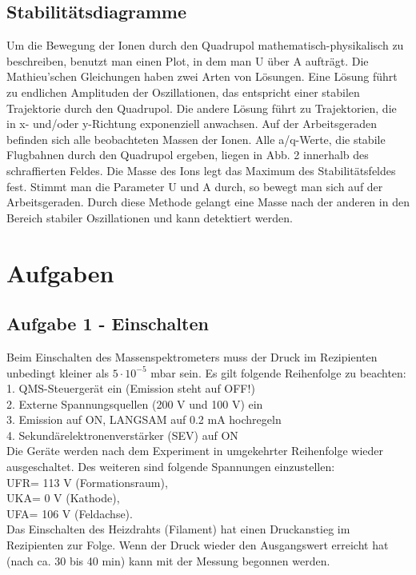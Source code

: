 \subsection{Stabilitätsdiagramme}
Um die Bewegung der Ionen durch den Quadrupol mathematisch-physikalisch zu beschreiben, benutzt man einen Plot, in dem man U über A aufträgt. Die Mathieu'schen Gleichungen haben zwei Arten von Lösungen. Eine Lösung führt zu endlichen Amplituden der Oszillationen, das entspricht einer stabilen Trajektorie durch den Quadrupol. Die andere Lösung führt zu Trajektorien, die in x- und/oder y-Richtung exponenziell anwachsen. Auf der Arbeitsgeraden befinden sich alle beobachteten Massen der Ionen. Alle a/q-Werte, die stabile Flugbahnen durch den Quadrupol ergeben, liegen in Abb. 2 innerhalb des schraffierten Feldes. Die Masse des Ions legt das Maximum des Stabilitätsfeldes fest. Stimmt man die Parameter U und A durch, so bewegt man sich auf der Arbeitsgeraden. Durch diese Methode gelangt eine Masse nach der anderen in den Bereich stabiler Oszillationen und kann detektiert werden.


\newpage
\section{Aufgaben}
\subsection*{Aufgabe 1 - Einschalten}
Beim Einschalten des Massenspektrometers muss der Druck im Rezipienten unbedingt kleiner als $5 \cdot 10^{-5}$ mbar sein. Es gilt folgende Reihenfolge zu beachten:\\ 
1. QMS-Steuergerät ein (Emission steht auf OFF!)\\ 
2. Externe Spannungsquellen (200 V und 100 V) ein\\ 
3. Emission auf ON, LANGSAM auf 0.2 mA hochregeln\\ 
4. Sekundärelektronenverstärker (SEV) auf ON\\
Die Geräte werden nach dem Experiment in umgekehrter Reihenfolge wieder ausgeschaltet. Des weiteren sind folgende Spannungen einzustellen:\\ 
UFR= 113 V   (Formationsraum), \\
UKA= 0 V   (Kathode), \\
UFA= 106 V   (Feldachse). \\
Das Einschalten des Heizdrahts (Filament) hat einen Druckanstieg im Rezipienten zur Folge. Wenn der Druck wieder den Ausgangswert erreicht hat (nach ca. 30 bis 40 min) kann mit der Messung begonnen werden. \\

